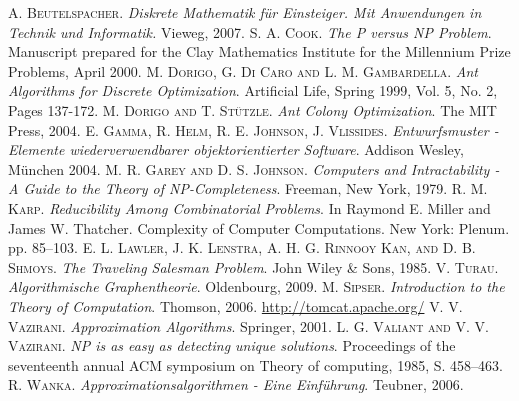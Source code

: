 \begin{thebibliography}{}
    \textsc{A. Beutelspacher.}
    \emph{Diskrete Mathematik für Einsteiger. Mit Anwendungen in Technik und Informatik.}
    Vieweg, 2007.
    \textsc{S. A. Cook}.
    \emph{The P versus NP Problem}.
    Manuscript prepared for the Clay Mathematics Institute for the Millennium Prize Problems, April 2000.
    \textsc{M. Dorigo, G. Di Caro and L. M. Gambardella}.
    \emph{Ant Algorithms for Discrete Optimization}.
    Artificial Life, Spring 1999, Vol. 5, No. 2, Pages 137-172.
    \textsc{M. Dorigo and T. Stützle}.
    \emph{Ant Colony Optimization}.
    The \textsc{MIT} Press, 2004.
    \textsc{E. Gamma, R. Helm, R. E. Johnson, J. Vlissides}.
    \emph{Entwurfsmuster - Elemente wiederverwendbarer objektorientierter Software}.
    Addison Wesley, München 2004.
    \textsc{M. R. Garey and D. S. Johnson}.
    \emph{Computers and Intractability - A Guide to the Theory of NP-Completeness}.
    Freeman, New York, 1979.
    \textsc{R. M. Karp}.
    \emph{Reducibility Among Combinatorial Problems}.
    In Raymond E. Miller and James W. Thatcher. Complexity of Computer Computations. New York: Plenum. pp. 85–103.
    \textsc{E. L. Lawler, J. K. Lenstra, A. H. G. Rinnooy Kan, and D. B. Shmoys}.
    \emph{The Traveling Salesman Problem}.
    John Wiley \& Sons, 1985.
    \textsc{V. Turau}.
    \emph{Algorithmische Graphentheorie}.
    Oldenbourg, 2009.
    \textsc{M. Sipser}.
    \emph{Introduction to the Theory of Computation}.
    Thomson, 2006.
    \url{http://tomcat.apache.org/}
    \textsc{V. V. Vazirani}.
    \emph{Approximation Algorithms}.
    Springer, 2001.
    \textsc{L. G. Valiant and V. V. Vazirani}.
    \emph{NP is as easy as detecting unique solutions}.
    Proceedings of the seventeenth annual ACM symposium on Theory of computing, 1985, S. 458–463.
    \textsc{R. Wanka}.
    \emph{Approximationsalgorithmen - Eine Einführung}.
    Teubner, 2006.
\end{thebibliography}